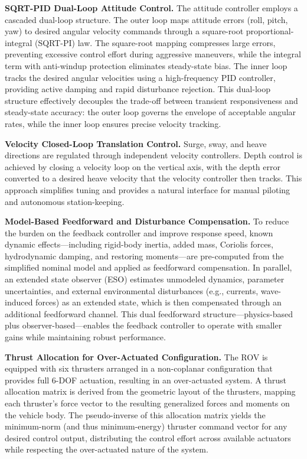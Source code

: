 \begin{digest}
\textbf{SQRT-PID Dual-Loop Attitude Control.} The attitude controller employs a cascaded dual-loop structure. The outer loop maps attitude errors (roll, pitch, yaw) to desired angular velocity commands through a square-root proportional-integral (SQRT-PI) law. The square-root mapping compresses large errors, preventing excessive control effort during aggressive maneuvers, while the integral term with anti-windup protection eliminates steady-state bias. The inner loop tracks the desired angular velocities using a high-frequency PID controller, providing active damping and rapid disturbance rejection. This dual-loop structure effectively decouples the trade-off between transient responsiveness and steady-state accuracy: the outer loop governs the envelope of acceptable angular rates, while the inner loop ensures precise velocity tracking.

\textbf{Velocity Closed-Loop Translation Control.} Surge, sway, and heave directions are regulated through independent velocity controllers. Depth control is achieved by closing a velocity loop on the vertical axis, with the depth error converted to a desired heave velocity that the velocity controller then tracks. This approach simplifies tuning and provides a natural interface for manual piloting and autonomous station-keeping.

\textbf{Model-Based Feedforward and Disturbance Compensation.} To reduce the burden on the feedback controller and improve response speed, known dynamic effects---including rigid-body inertia, added mass, Coriolis forces, hydrodynamic damping, and restoring moments---are pre-computed from the simplified nominal model and applied as feedforward compensation. In parallel, an extended state observer (ESO) estimates unmodeled dynamics, parameter uncertainties, and external environmental disturbances (e.g., currents, wave-induced forces) as an extended state, which is then compensated through an additional feedforward channel. This dual feedforward structure---physics-based plus observer-based---enables the feedback controller to operate with smaller gains while maintaining robust performance.

\textbf{Thrust Allocation for Over-Actuated Configuration.} The ROV is equipped with six thrusters arranged in a non-coplanar configuration that provides full 6-DOF actuation, resulting in an over-actuated system. A thrust allocation matrix is derived from the geometric layout of the thrusters, mapping each thruster's force vector to the resulting generalized forces and moments on the vehicle body. The pseudo-inverse of this allocation matrix yields the minimum-norm (and thus minimum-energy) thruster command vector for any desired control output, distributing the control effort across available actuators while respecting the over-actuated nature of the system.


\end{digest}
